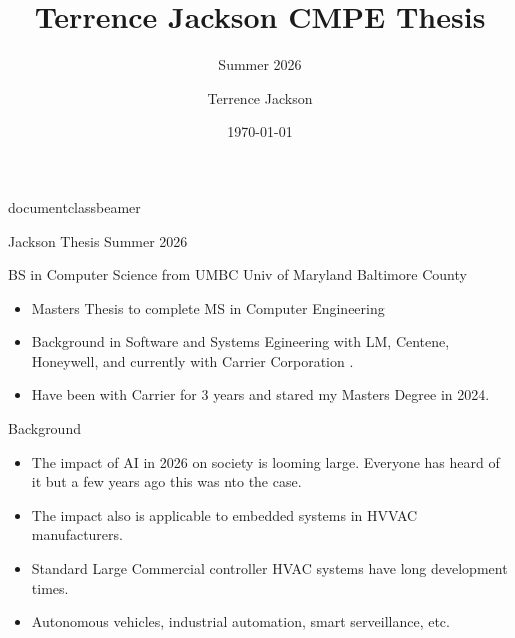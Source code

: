 documentclass{beamer}


\title{Terrence Jackson CMPE Thesis}
\subtitle{Summer 2026}
\author{Terrence Jackson}
\date{\today}



\begin{frame}
    \Terrence Jackson Thesis Summer 2026
\end{frame}

\begin{frame}{BS in Computer Science from UMBC Univ of Maryland Baltimore
County }
    \begin{itemize}
        \item Masters Thesis to complete MS in Computer Engineering
        \item Background in Software and Systems Egineering with LM,
Centene, Honeywell, and currently with Carrier Corporation .
        \item Have been with Carrier for 3 years and stared my Masters
Degree in 2024.
    \end{itemize}
\end{frame}

\begin{frame}{Background}
    \begin{itemize}
        \item The impact of AI in 2026 on society is looming large. Everyone
has heard of it but a few years ago this was nto the case.  
        \item The impact also is applicable to embedded systems in
HVVAC manufacturers. 
        \item Standard Large Commercial controller HVAC systems have
long development times. 
		\item Autonomous vehicles, industrial automation, smart
serveillance, etc.  
    \end{itemize}
\end{frame}
